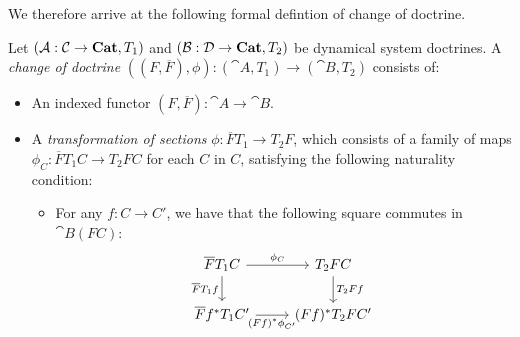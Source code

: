 \documentclass[DynamicalBook]{subfiles}
\begin{document}
We therefore arrive at the following formal defintion of change of doctrine.
\begin{definition}\label{def.change_of_doctrine}
  Let $(\mathcal{A} : \mathcal{C} \to \textbf{Cat}, T_1)$ and $(\mathcal{B} : \mathcal{D} \to
  \textbf{Cat}, T_2)$ be dynamical system doctrines. A \emph{change of doctrine}
  $((F, \overline{F}), \phi) : (\cat{A}, T_1) \to (\cat{B}, T_2)$ consists of:
\begin{itemize}
  \item An indexed functor $(F, \overline{F}) : \cat{A} \to \cat{B}$. 
  \item A \emph{transformation of sections} $\phi : \overline{F}T_1 \to T_2 F$,
    which consists of a family of maps $\phi_C : \overline{F}T_1 C \to T_2 FC$
    for each $C$ in $C$, satisfying the following naturality condition:
    \begin{itemize}
      \item For any $f : C \to C'$, we have that the following square commutes
        in $\cat{B}(FC)$:
        \[
\begin{tikzcd}
\overline{F}T_1 C  \ar[d, "\overline{F}T_1f"'] \ar[r, "\phi_C"]& T_2 F C \ar[d, "T_2Ff"] \\
\overline{F}f^{\ast}T_1 C' \ar[r,"(Ff)^{\ast}\phi_{C'}"']& (Ff)^{\ast}T_2 FC'
\end{tikzcd}
\]
\end{itemize}

\end{itemize} 
\end{definition}
\end{document}
